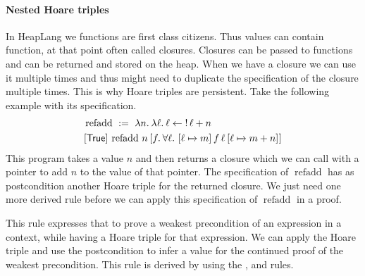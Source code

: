 \documentclass[thesis.tex]{subfiles}
\begin{document}
\paragraph*{Nested Hoare triples}
In HeapLang we functions are first class citizens. Thus values can contain function, at that point often called closures. Closures can be passed to functions and can be returned and stored on the heap. When we have a closure we can use it multiple times and thus might need to duplicate the specification of the closure multiple times. This is why Hoare triples are persistent. Take the following example with its specification.
\begin{align*}
   & \operatorname{refadd}\ :=\ \Lam n. \Lam \loc. \loc \gets \deref \loc + n                                                 \\
   & \hoare{\TRUE}{\operatorname{refadd}\, n}{\Ret f. {\forall \loc.\ \hoare{\loc \fmapsto m}{f\, \loc}{\loc\fmapsto m + n}}}
\end{align*}
This program takes a value $n$ and then returns a closure which we can call with a pointer to add $n$ to the value of that pointer. The specification of $\operatorname{refadd}$ has as postcondition another Hoare triple for the returned closure. We just need one more derived rule before we can apply this specification of $\operatorname{refadd}$ in a proof.
This rule expresses that to prove a weakest precondition of an expression in a context, while having a Hoare triple for that expression. We can apply the Hoare triple and use the postcondition to infer a value for the continued proof of the weakest precondition. This rule is derived by using the ,  and  rules.
\end{document}
